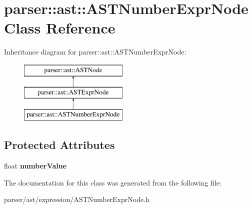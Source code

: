 \hypertarget{classparser_1_1ast_1_1ASTNumberExprNode}{}\section{parser\+:\+:ast\+:\+:A\+S\+T\+Number\+Expr\+Node Class Reference}
\label{classparser_1_1ast_1_1ASTNumberExprNode}
Inheritance diagram for parser\+:\+:ast\+:\+:A\+S\+T\+Number\+Expr\+Node\+:\begin{figure}[H]
\begin{center}
\leavevmode
\includegraphics[height=3.000000cm]{d1/d79/classparser_1_1ast_1_1ASTNumberExprNode}
\end{center}
\end{figure}
\subsection*{Protected Attributes}
\begin{DoxyCompactItemize}
\item 
\mbox{\label{classparser_1_1ast_1_1ASTNumberExprNode_a36a8606e710fc7fb7c4cca3ec898f9bf}} 
float {\bfseries number\+Value}
\end{DoxyCompactItemize}


The documentation for this class was generated from the following file\+:\begin{DoxyCompactItemize}
\item 
parser/ast/expression/A\+S\+T\+Number\+Expr\+Node.\+h\end{DoxyCompactItemize}
